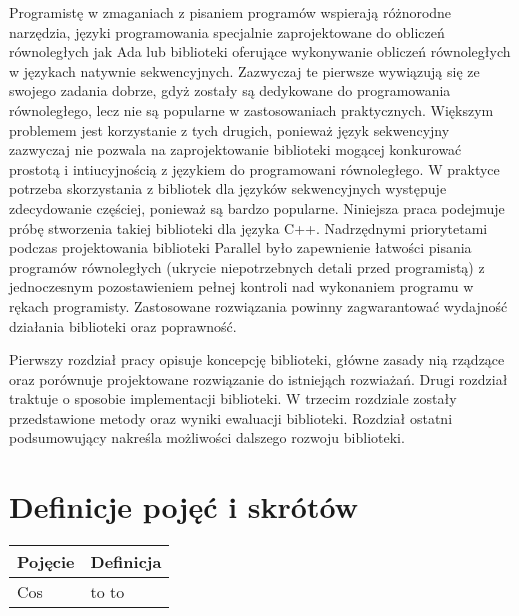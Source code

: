   Programistę w zmaganiach z pisaniem programów wspierają różnorodne narzędzia, języki programowania specjalnie zaprojektowane do obliczeń równoległych jak Ada lub biblioteki oferujące wykonywanie obliczeń równoległych
  w językach natywnie sekwencyjnych.
  Zazwyczaj te pierwsze wywiązują się ze swojego zadania dobrze, gdyż zostały są dedykowane do programowania równoległego, lecz nie są popularne w zastosowaniach praktycznych.
  Większym problemem jest korzystanie z tych drugich, ponieważ język sekwencyjny zazwyczaj nie pozwala na zaprojektowanie biblioteki mogącej konkurować prostotą i intiucyjnością z językiem do programowani równoległego.
  W praktyce potrzeba skorzystania z bibliotek dla języków sekwencyjnych występuje zdecydowanie częściej, ponieważ są bardzo popularne.
  Niniejsza praca podejmuje próbę stworzenia takiej biblioteki dla języka C++.
  Nadrzędnymi priorytetami podczas projektowania biblioteki Parallel było zapewnienie łatwości pisania programów równoległych (ukrycie niepotrzebnych detali przed programistą) z jednoczesnym pozostawieniem pełnej kontroli 
  nad wykonaniem programu w rękach programisty. Zastosowane rozwiązania powinny zagwarantować wydajność działania biblioteki oraz poprawność.

  Pierwszy rozdział pracy opisuje koncepcję biblioteki, główne zasady nią rządzące oraz porównuje projektowane rozwiązanie do istniejąch rozwiażań.
  Drugi rozdział traktuje o sposobie implementacji biblioteki.
  W trzecim rozdziale zostały przedstawione metody oraz wyniki ewaluacji biblioteki.
  Rozdział ostatni podsumowujący nakreśla możliwości dalszego rozwoju biblioteki.

\section*{Definicje pojęć i skrótów}
\begin{tabular}{ | l | l |}
  \hline
  \textbf{Pojęcie} & \textbf{Definicja} \\ \hline
  Cos & to to \\ 
  \hline
\end{tabular} 